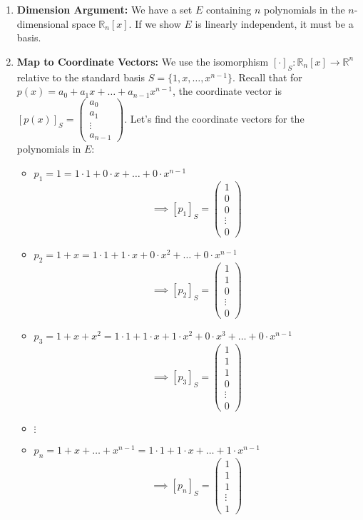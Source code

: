 \documentclass[11pt]{article}
\theoremstyle{definition}
\theoremstyle{remark}
\newcommand{\R}{\mathbb{R}}
\newcommand{\mat}[1]{\begin{pmatrix}#1\end{pmatrix}}
\begin{document}
\begin{enumerate} %
    \item \textbf{Dimension Argument:} We have a set $E$ containing $n$ polynomials in the $n$-dimensional space $\R_n[x]$. If we show $E$ is linearly independent, it must be a basis.

    \item \textbf{Map to Coordinate Vectors:} We use the isomorphism $[\cdot]_S: \R_n[x] \to \R^n$ relative to the standard basis $S=\{1, x, \dots, x^{n-1}\}$.
    Recall that for $p(x) = a_0 + a_1 x + \dots + a_{n-1} x^{n-1}$, the coordinate vector is $[p(x)]_S = \mat{a_0 \\ a_1 \\ \vdots \\ a_{n-1}}$.
    Let's find the coordinate vectors for the polynomials in $E$:
    \begin{itemize}
        \item $p_1 = 1 = 1 \cdot 1 + 0 \cdot x + \dots + 0 \cdot x^{n-1}$
          \[ \implies [p_1]_S = \mat{1 \\ 0 \\ 0 \\ \vdots \\ 0} \]
        \item $p_2 = 1 + x = 1 \cdot 1 + 1 \cdot x + 0 \cdot x^2 + \dots + 0 \cdot x^{n-1}$
          \[ \implies [p_2]_S = \mat{1 \\ 1 \\ 0 \\ \vdots \\ 0} \]
        \item $p_3 = 1 + x + x^2 = 1 \cdot 1 + 1 \cdot x + 1 \cdot x^2 + 0 \cdot x^3 + \dots + 0 \cdot x^{n-1}$
          \[ \implies [p_3]_S = \mat{1 \\ 1 \\ 1 \\ 0 \\ \vdots \\ 0} \]
        \item $\vdots$
        \item $p_n = 1 + x + \dots + x^{n-1} = 1 \cdot 1 + 1 \cdot x + \dots + 1 \cdot x^{n-1}$
          \[ \implies [p_n]_S = \mat{1 \\ 1 \\ 1 \\ \vdots \\ 1} \]
    \end{itemize}


\end{enumerate}
\end{document}

